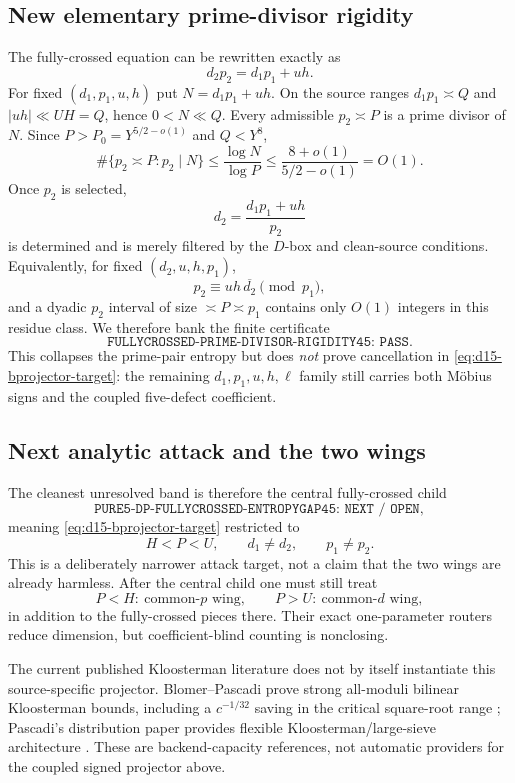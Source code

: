 \documentclass[11pt]{article}
\theoremstyle{definition}
\newcommand{\1}{\mathbf 1}
\begin{document}
\subsection{New elementary prime-divisor rigidity}
The fully-crossed equation can be rewritten exactly as
\begin{equation}
 \boxed{d_2p_2=d_1p_1+uh.}
 \label{eq:d15-divisor-rigidity}
\end{equation}
For fixed $(d_1,p_1,u,h)$ put $N=d_1p_1+uh$.  On the source ranges
$d_1p_1\asymp Q$ and $|uh|\ll UH=Q$, hence $0<N\ll Q$.  Every admissible
$p_2\asymp P$ is a prime divisor of $N$.  Since $P>P_0=Y^{5/2-o(1)}$ and
$Q<Y^8$,
\[
 \#\{p_2\asymp P:p_2\mid N\}
 \le \frac{\log N}{\log P}
 \le \frac{8+o(1)}{5/2-o(1)}=O(1).
\]
Once $p_2$ is selected,
\[
 \boxed{d_2=\frac{d_1p_1+uh}{p_2}}
\]
is determined and is merely filtered by the $D$-box and clean-source
conditions.  Equivalently, for fixed $(d_2,u,h,p_1)$,
\[
 p_2\equiv uh\,\overline{d_2}\pmod{p_1},
\]
and a dyadic $p_2$ interval of size $\asymp P\asymp p_1$ contains only $O(1)$
integers in this residue class.  We therefore bank the finite certificate
\[
 \boxed{\texttt{FULLYCROSSED-PRIME-DIVISOR-RIGIDITY45: PASS}}.
\]
This collapses the prime-pair entropy but does \emph{not} prove cancellation
in \eqref{eq:d15-bprojector-target}: the remaining $d_1,p_1,u,h,\ell$ family
still carries both M\"obius signs and the coupled five-defect coefficient.

\subsection{Next analytic attack and the two wings}
The cleanest unresolved band is therefore the central fully-crossed child
\[
 \boxed{\texttt{PURE5-DP-FULLYCROSSED-ENTROPYGAP45: NEXT / OPEN}},
\]
meaning \eqref{eq:d15-bprojector-target} restricted to
\[
 H<P<U,\qquad d_1\ne d_2,\qquad p_1\ne p_2.
\]
This is a deliberately narrower attack target, not a claim that the two wings
are already harmless.  After the central child one must still treat
\[
 P<H:\ \text{common-$p$ wing},\qquad
 P>U:\ \text{common-$d$ wing},
\]
in addition to the fully-crossed pieces there.  Their exact one-parameter
routers reduce dimension, but coefficient-blind counting is nonclosing.

The current published Kloosterman literature does not by itself instantiate
this source-specific projector.  Blomer--Pascadi prove strong all-moduli
bilinear Kloosterman bounds, including a $c^{-1/32}$ saving in the critical
square-root range \cite{BlomerPascadi2026}; Pascadi's distribution paper
provides flexible Kloosterman/large-sieve architecture \cite{PascadiDistribution2025}.
These are backend-capacity references, not automatic providers for the
coupled signed projector above.
\end{document}
